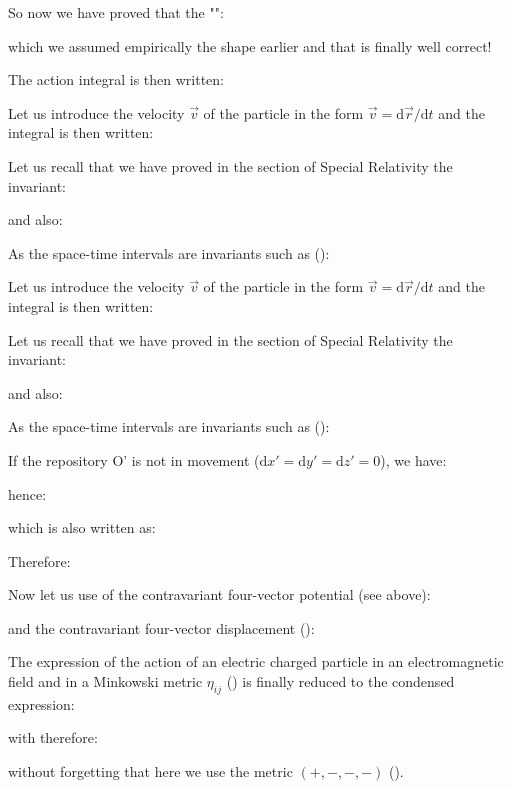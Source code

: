 	So now we have proved that the "":
	
	which we assumed empirically the shape earlier and that is finally well correct!

	The action integral is then written:
	
	Let us introduce the velocity $\vec{v}$ of the particle in the form $\vec{v}=\mathrm{d}\vec{r}/\mathrm{d}t$ and the integral is then written:
	
	Let us recall that we have proved in the section of Special Relativity the invariant:
	
	and also:
	
	As the space-time intervals are invariants such as ():
	
	Let us introduce the velocity $\vec{v}$ of the particle in the form $\vec{v}=\mathrm{d}\vec{r}/\mathrm{d}t$ and the integral is then written:
	
	Let us recall that we have proved in the section of Special Relativity the invariant:
	
	and also:
	
	As the space-time intervals are invariants such as ():
	
	If the repository O' is not in movement ($\mathrm{d}x'=\mathrm{d}y'=\mathrm{d}z'=0$), we have:
	
	hence:
	
	which is also written as\label{action variation}:
	
	Therefore:
	
	Now let us use of the contravariant four-vector potential (see above):
	
	and the contravariant four-vector displacement ():
	
	The expression of the action of an electric charged particle in an electromagnetic field and in a Minkowski metric $\eta_{ij}$ () is finally reduced to the condensed expression:
	
	with therefore:
	
	without forgetting that here we use the metric $(+, -, -, -)$ ().
	
